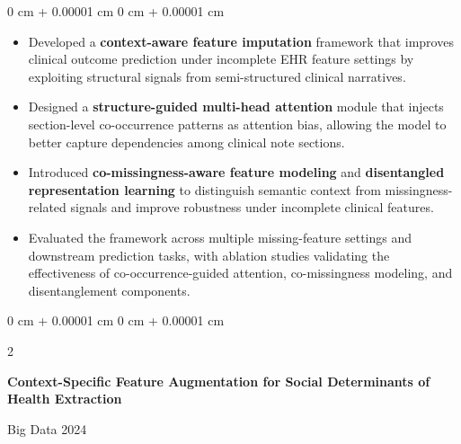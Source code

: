 \documentclass[10pt, letterpaper]{article}
\newenvironment{highlights}{
    \begin{itemize}[
        topsep=0.10 cm,
        parsep=0.10 cm,
        partopsep=0pt,
        itemsep=0pt,
        leftmargin=0 cm + 10pt
    ]
}{
    \end{itemize}
} %
\newenvironment{onecolentry}{
    \begin{adjustwidth}{
        0 cm + 0.00001 cm
    }{
        0 cm + 0.00001 cm
    }
}{
    \end{adjustwidth}
} %
\newenvironment{twocolentry}[2][]{
    \onecolentry
    \def\secondColumn{#2}
    \setcolumnwidth{\fill, 4.5 cm}
    \begin{paracol}{2}
}{
    \switchcolumn \raggedleft \secondColumn
    \end{paracol}
    \endonecolentry
} %
\begin{document}
\vspace{0.05 cm}
\begin{onecolentry}
    \begin{highlights}
        \item Developed a \textbf{context-aware feature imputation} framework that improves clinical outcome prediction under incomplete EHR feature settings by exploiting structural signals from semi-structured clinical narratives.
        
        \item Designed a \textbf{structure-guided multi-head attention} module that injects section-level co-occurrence patterns as attention bias, allowing the model to better capture dependencies among clinical note sections.
        
        \item Introduced \textbf{co-missingness-aware feature modeling} and \textbf{disentangled representation learning} to distinguish semantic context from missingness-related signals and improve robustness under incomplete clinical features.
        
        \item Evaluated the framework across multiple missing-feature settings and downstream prediction tasks, with ablation studies validating the effectiveness of co-occurrence-guided attention, co-missingness modeling, and disentanglement components.
        
    \end{highlights}
\end{onecolentry}

\vspace{0.10 cm}

\begin{twocolentry}{
    Big Data 2024
}
    \textbf{Context-Specific Feature Augmentation for Social Determinants of Health Extraction}
\end{twocolentry}
\end{document}
